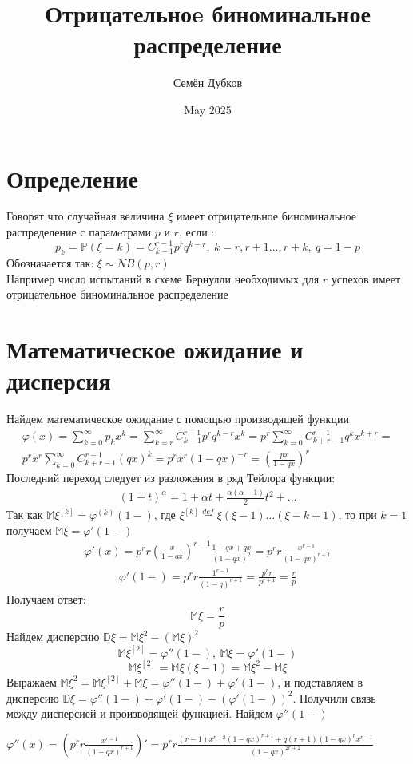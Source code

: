 \documentclass{article}
\title{Отрицательноe биноминальное распределение}
\author{Семён Дубков}
\date{May 2025}
\begin{document}
\maketitle
\fontsize{13}{15}\selectfont
\section{Определение}
Говорят что случайная величина $\xi$ имеет отрицательное биноминальное распределение с парамeтрами $p$ и $r$, если :
\[
p_k = \mathbb{P}( \xi = k) = C_{k-1}^{r-1} p^rq^{k-r},\ k=r,r+1 \dots ,r+k, \ q = 1-p
\]
Обозначается так: $\xi \sim NB(p,r) $\\
Например число испытаний в схеме Бернулли необходимых для $r$ успехов имеет отрицательное биноминальное распределение

\section{Математическое ожидание и дисперсия}
Найдем математическое ожидание с помощью производящей функции
\begin{align*}
\varphi(x)=\sum_{k=0}^{\infty}p_kx^k = \sum_{k=r}^{\infty}C_{k-1}^{r-1}p^rq^{k-r}x^k=p^r\sum_{k=0}^{\infty}C_{k+r-1}^{r-1}q^kx^{k+r}=\\
p^rx^r\sum_{k=0}^{\infty}C_{k+r-1}^{r-1}(qx)^k=p^rx^r(1-qx)^{-r}=\left(\frac{px}{1-qx}\right)^r
\end{align*}
Последний переход следует из разложения в ряд Тейлора функции:
\begin{align*}
    (1+t)^{\alpha}=1+\alpha t+\frac{\alpha(\alpha-1)}{2}t^2+\dots
\end{align*}
Так как $\mathbb{M}\xi^{[k]}=\varphi^{(k)}(1-) $, где $\xi^{[k]}\overset{def}{=}\xi(\xi-1)\dots(\xi-k+1)$, то при $k=1$ получаем $\mathbb{M}\xi=\varphi'(1-)$
\begin{align*}
    \varphi'(x) = p^rr(\frac{x}{1-qx})^{r-1}\frac{1-qx+qx}{(1-qx)^2}=p^rr\frac{x^{r-1}}{(1-qx)^{r+1}}
\end{align*}
\begin{align*}
    \varphi'(1-)=p^rr\frac{1^{r-1}}{(1-q)^{r+1}}=\frac{p^rr}{p^{r+1}}=\frac{r}{p}
\end{align*}
Получаем ответ:
\[
\boxed{\mathbb{M}\xi=\frac{r}{p}}
\]
Найдем дисперсию $\mathbb{D\xi}=\mathbb{M}\xi^{2}-(\mathbb{M\xi})^2$
\[
\mathbb{M}\xi^{[2]}=\varphi''(1-),\ \mathbb{M}\xi=\varphi'(1-)
\]
\[
\mathbb{M}\xi^{[2]}=\mathbb{M}\xi(\xi-1)=\mathbb{M}\xi^2-\mathbb{M}\xi
\]
Выражаем $\mathbb{M}\xi^2 = \mathbb{M}\xi^{[2]}+\mathbb{M}\xi=\varphi''(1-)+\varphi'(1-)$, и подставляем в дисперсию $\mathbb{D\xi}=\varphi''(1-)+\varphi'(1-)-(\varphi'(1-))^2$. Получили связь между дисперсией и производящей функцией. Найдем $\varphi''(1-)$
\begin{center}
$\varphi''(x)=\left(p^rr\frac{x^{r-1}}{(1-qx)^{r+1}}\right)'=p^rr\frac{(r-1)x^{r-2}(1-qx)^{r+1}+q(r+1)(1-qx)^rx^{r-1}}{(1-qx)^{2r+2}}$    
\end{center}
\end{document}
